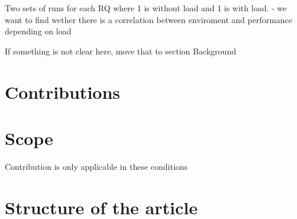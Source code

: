 Two sets of runs for each RQ where 1 is without load and 1 is with load. 
- we want to find wether there is a correlation between enviroment and performance depending on load

If something is not clear here, move that to section Background

\section{Contributions}

\section{Scope}
Contribution is only applicable in these conditions

\section{Structure of the article}


	